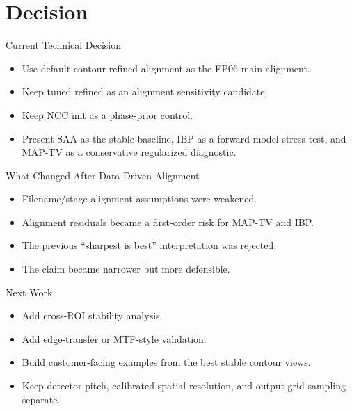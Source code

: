 \section{Decision}

\begin{frame}{Current Technical Decision}
  \begin{itemize}
    \item Use default contour refined alignment as the EP06 main alignment.
    \item Keep tuned refined as an alignment sensitivity candidate.
    \item Keep NCC init as a phase-prior control.
    \item Present SAA as the stable baseline, IBP as a forward-model stress test, and MAP-TV as a conservative regularized diagnostic.
  \end{itemize}
\end{frame}

\begin{frame}{What Changed After Data-Driven Alignment}
  \begin{itemize}
    \item Filename/stage alignment assumptions were weakened.
    \item Alignment residuals became a first-order risk for MAP-TV and IBP.
    \item The previous ``sharpest is best'' interpretation was rejected.
    \item The claim became narrower but more defensible.
  \end{itemize}
\end{frame}

\begin{frame}{Next Work}
  \begin{itemize}
    \item Add cross-ROI stability analysis.
    \item Add edge-transfer or MTF-style validation.
    \item Build customer-facing examples from the best stable contour views.
    \item Keep detector pitch, calibrated spatial resolution, and output-grid sampling separate.
  \end{itemize}
\end{frame}

